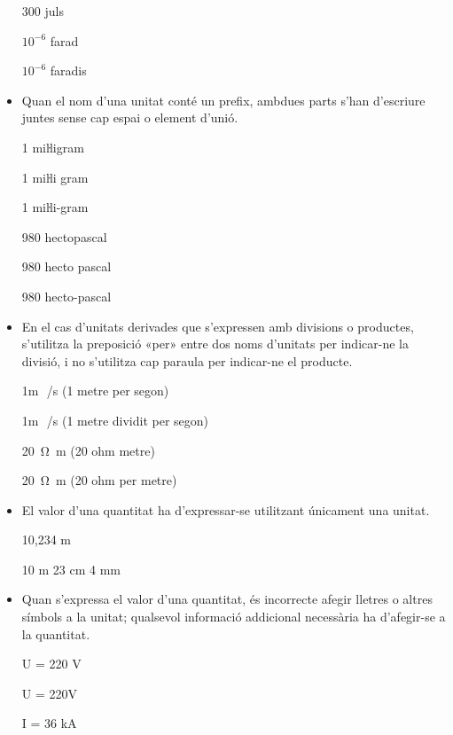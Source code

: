 \begin{itemize}
\textcolor{Red}\faTimesCircle{}  300 juls

\textcolor{Green}\faCheckSquare{} $10^{-6}$ farad

\textcolor{Red}\faTimesCircle{}  $10^{-6}$ faradis


 \item Quan el nom d'una unitat
conté un prefix, ambdues parts s'han d'escriure juntes sense cap espai o element d'unió.

\textcolor{Green}\faCheckSquare{} 1 miŀligram

\textcolor{Red}\faTimesCircle{} 1 miŀli gram

\textcolor{Red}\faTimesCircle{} 1 miŀli-gram

\textcolor{Green}\faCheckSquare{}  980 hectopascal

\textcolor{Red}\faTimesCircle{} 980 hecto pascal

\textcolor{Red}\faTimesCircle{} 980 hecto-pascal


\item En el cas  d'unitats derivades que s'expressen amb divisions o
productes, s'utilitza la preposició «per» entre dos noms d'unitats
per indicar-ne la divisió, i no s'utilitza cap paraula per indicar-ne el
producte.

\textcolor{Green}\faCheckSquare{} 1\unit{m\,/s} (1 metre per segon)

\textcolor{Red}\faTimesCircle{}  1\unit{m\,/s} (1 metre dividit per segon)

 \textcolor{Green}\faCheckSquare{} \SI{20}{\ohm.m} (20 ohm metre)

\textcolor{Red}\faTimesCircle{}   \SI{20}{\ohm.m} (20 ohm  per metre)


\item El valor d'una quantitat ha d'expressar-se  utilitzant únicament una
unitat.

\textcolor{Green}\faCheckSquare{} 10,234 m

\textcolor{Red}\faTimesCircle{}  10 m 23 cm 4 mm


\item Quan s'expressa el valor d'una quantitat, és incorrecte afegir
lletres o altres símbols a la unitat; qualsevol informació
addicional necessària ha d'afegir-se a la quantitat.

\textcolor{Green}\faCheckSquare{} U = 220 V

\textcolor{Red}\faTimesCircle{}  U = 220\unit{V}

\textcolor{Green}\faCheckSquare{}  I = 36 kA


\end{itemize}
